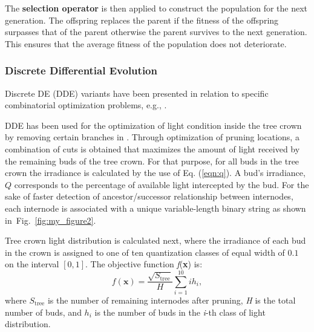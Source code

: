 The \textbf{selection operator} is then applied to construct the population for the next generation. The offspring replaces the parent if the fitness of the offspring surpasses that of the parent otherwise the parent survives to the next generation. This ensures that the average fitness of the population does not deteriorate.

\subsubsection{Discrete Differential Evolution}
Discrete DE (DDE) variants have been presented in relation to specific
combinatorial optimization problems, e.g., \cite{davendra_flow_2009,pan_discrete_2008,wang_novel_2010}. 

DDE has
been used for the optimization of light condition inside the tree crown
by removing certain branches in \cite{strnad_novel_2017}.
Through optimization of pruning locations, a combination of cuts is obtained
that maximizes the amount of light received by the remaining buds of the
tree crown. For that purpose, for all buds in the tree crown the
irradiance is calculated by the use of Eq. (\ref{eqn:q}). A bud's irradiance, \(Q\)
corresponds to the percentage of available light intercepted by the bud.
For the sake of faster detection of ancestor/successor relationship
between internodes, each internode is associated with a unique
variable-length binary string as shown in~Fig.~\ref{fig:my_figure2}. 

Tree crown light
distribution is calculated next, where the irradiance of each bud in the crown is assigned to one of ten quantization classes of equal width of $0.1$ on
the interval $[0, 1]$. The objective function 
\emph{f}(\textbf{x}) is:
\begin{equation}
 f\left( \mathbf{x} \right) = \frac{\sqrt{S_{\mathrm{\text{tree}}}}}{H}\sum_{i = 1}^{10}{i  h_{i}}, 
\end{equation}
where \(S_{\mathrm{\text{tree}}}\) is the number of remaining internodes
after pruning, \emph{H} is the total number of buds, and \(h_{i}\) is
the number of buds in the \emph{i}-th class of light distribution.

